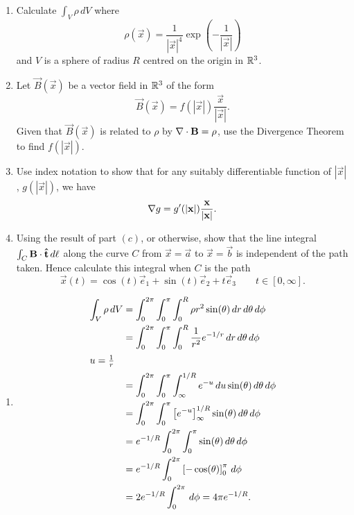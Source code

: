 \documentclass[10pt, a4paper]{article}
\begin{document}
\begin{problem}[$2009$ Question $8$]\phantom{}
    \begin{enumerate}[label = (\alph*)]
        \item Calculate $\int_{V}\rho\,dV$ where
        \[
        \rho(\vec{x}) = \frac{1}{|\vec{x}| ^ 4}\exp\left(-\frac{1}{|\vec{x}|}\right)
        \]
        and $V$ is a sphere of radius $R$ centred on the origin in $\mathbb{R} ^ 3$.

        \item Let $\vec{B}(\vec{x})$ be a vector field in $\mathbb{R} ^ 3$ of the form
        \[
        \vec{B}(\vec{x}) = f(|\vec{x}|)\frac{\vec{x}}{|\vec{x}|}.
        \]
        Given that $\vec{B}(\vec{x})$ is related to $\rho$ by $\mathbf{\nabla} \cdot \mathbf{B} = \rho$,
        use the Divergence Theorem to find $f(|\vec{x}|)$.

        \item Use index notation to show that for any suitably differentiable function of $|\vec{x}|$,
        $g(|\vec{x}|)$,
        we have
        \[
        \mathbf{\nabla} g = g'(|\mathbf{x}|)\frac{\mathbf{x}}{|\mathbf{x}|}.
        \]

        \item Using the result of part $(c)$,
        or otherwise,
        show that the line integral $\int_{C}\mathbf{B}\cdot\mathbf{\hat{t}}\,d\ell$ along the curve $C$ from $\vec{x} = \vec{a}$ to $\vec{x} = \vec{b}$ is independent of the path taken.
        Hence calculate this integral when $C$ is the path
        \[
        \vec{x}(t) = \cos(t)\vec{e}_1 + \sin(t)\vec{e}_2 + t\vec{e}_3\qquad t \in [0, \infty].
        \]
    \end{enumerate}

    \begin{solution}\phantom{}
        \begin{enumerate}[label = (\alph*)]
            \item
            \begin{align*}
                \int_{V}\rho\,dV &= \int_{0}^{2\pi}\int_{0}^{\pi}\int_{0}^{R}\rho r ^ 2\sin(\theta)\,dr\,d\theta\,d\phi \\
                &= \int_{0}^{2\pi}\int_{0}^{\pi}\int_{0}^{R}\frac{1}{r ^ 2}e ^ {-1 / r}\,dr\,d\theta\,d\phi \\
                \intertext{$u = \frac{1}{r}$}
                &= \int_{0}^{2\pi}\int_{0}^{\pi}\int_{\infty}^{1 / R}e ^ {-u}\,du\sin(\theta)\,d\theta\,d\phi \\
                &= \int_{0}^{2\pi}\int_{0}^{\pi}\left[e ^ {-u}\right]_{\infty}^{1 / R}\sin(\theta)\,d\theta\,d\phi \\
                &= e ^ {-1 / R}\int_{0}^{2\pi}\int_{0}^{\pi}\sin(\theta)\,d\theta\,d\phi \\
                &= e ^ {-1 / R}\int_{0}^{2\pi}\left[-\cos(\theta)\right]_{0}^{\pi}\,d\phi \\
                &= 2e ^ {-1 / R}\int_{0}^{2\pi}\,d\phi = 4\pi e ^ {-1 / R}.
            \end{align*}


\end{enumerate}
\end{solution}
\end{problem}
\end{document}
